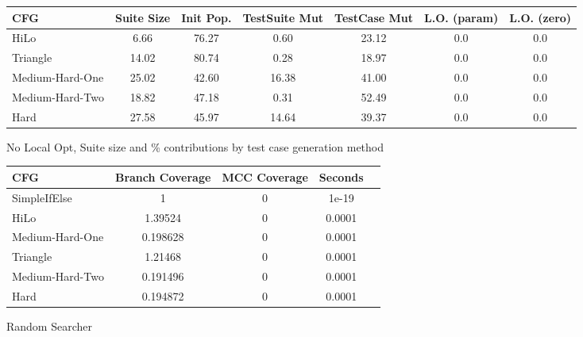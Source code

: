 \documentclass[runningheads]{llncs}
\begin{document}
\begin{figure}[h!]
	\begin{center}
		\begin{tabular}{| l | c || c | c | c | c | c |}
			\hline
			CFG             & Suite Size & Init Pop. & TestSuite Mut & TestCase Mut & L.O. (param)  & L.O. (zero) \\ \hline
			HiLo            & 6.66  & 76.27 & 0.60   & 23.12  & 0.0  & 0.0	\\ \hline
			Triangle        & 14.02  & 80.74  & 0.28   & 18.97  & 0.0  & 0.0 \\ \hline
			Medium-Hard-One & 25.02  & 42.60 & 16.38  & 41.00  & 0.0  & 0.0 \\ \hline
			Medium-Hard-Two & 18.82 & 47.18 & 0.31  & 52.49 & 0.0 & 0.0 \\ \hline
			Hard            & 27.58 & 45.97 & 14.64  & 39.37 & 0.0 & 0.0 \\ \hline
		\end{tabular}
	\end{center}
	\caption{No Local Opt, Suite size and \% contributions by test case generation method}
	\label{fig:finalResultNoLOContrib}
\end{figure}




\begin{figure}[h!]
\begin{center}
	\begin{tabular}{| l | c | c | c | c |}
		\hline
		CFG & Branch Coverage & MCC Coverage &  Seconds \\ \hline
		SimpleIfElse & 1 & 0 & 1e-19 \\ \hline
		HiLo & 1.39524 & 0 & 0.0001 \\ \hline
		Medium-Hard-One & 0.198628 & 0 & 0.0001 \\ \hline
		Triangle & 1.21468 & 0 & 0.0001 \\ \hline
		Medium-Hard-Two & 0.191496 & 0 & 0.0001 \\ \hline
		Hard & 0.194872 & 0 & 0.0001 \\ \hline
	\end{tabular}
\end{center}
\caption{Random Searcher \label{fig:finalResultRandomSearcher}}
\end{figure}

\FloatBarrier
\newpage
\end{document}
